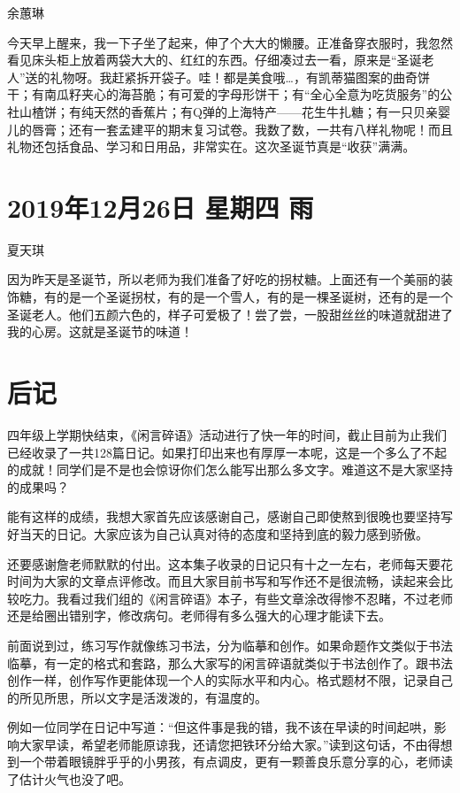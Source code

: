 余蕙琳

今天早上醒来，我一下子坐了起来，伸了个大大的懒腰。正准备穿衣服时，我忽然看见床头柜上放着两袋大大的、红红的东西。仔细凑过去一看，原来是“圣诞老人”送的礼物呀。我赶紧拆开袋子。哇！都是美食哦\ldots，有凯蒂猫图案的曲奇饼干；有南瓜籽夹心的海苔脆；有可爱的字母形饼干；有“全心全意为吃货服务”的公社山楂饼；有纯天然的香蕉片；有Q弹的上海特产——花生牛扎糖；有一只贝亲婴儿的唇膏；还有一套孟建平的期末复习试卷。我数了数，一共有八样礼物呢！而且礼物还包括食品、学习和日用品，非常实在。这次圣诞节真是“收获”满满。

\section{2019年12月26日 星期四 雨}

夏天琪

因为昨天是圣诞节，所以老师为我们准备了好吃的拐杖糖。上面还有一个美丽的装饰糖，有的是一个圣诞拐杖，有的是一个雪人，有的是一棵圣诞树，还有的是一个圣诞老人。他们五颜六色的，样子可爱极了！尝了尝，一股甜丝丝的味道就甜进了我的心房。这就是圣诞节的味道！

\section{后记}

四年级上学期快结束，《闲言碎语》活动进行了快一年的时间，截止目前为止我们已经收录了一共128篇日记。如果打印出来也有厚厚一本呢，这是一个多么了不起的成就！同学们是不是也会惊讶你们怎么能写出那么多文字。难道这不是大家坚持的成果吗？

能有这样的成绩，我想大家首先应该感谢自己，感谢自己即使熬到很晚也要坚持写好当天的日记。大家应该为自己认真对待的态度和坚持到底的毅力感到骄傲。

还要感谢詹老师默默的付出。这本集子收录的日记只有十之一左右，老师每天要花时间为大家的文章点评修改。而且大家目前书写和写作还不是很流畅，读起来会比较吃力。我看过我们组的《闲言碎语》本子，有些文章涂改得惨不忍睹，不过老师还是给圈出错别字，修改病句。老师得有多么强大的心理才能读下去。

前面说到过，练习写作就像练习书法，分为临摹和创作。如果命题作文类似于书法临摹，有一定的格式和套路，那么大家写的闲言碎语就类似于书法创作了。跟书法创作一样，创作写作更能体现一个人的实际水平和内心。格式题材不限，记录自己的所见所思，所以文字是活泼泼的，有温度的。

例如一位同学在日记中写道：“但这件事是我的错，我不该在早读的时间起哄，影响大家早读，希望老师能原谅我，还请您把铁环分给大家。”读到这句话，不由得想到一个带着眼镜胖乎乎的小男孩，有点调皮，更有一颗善良乐意分享的心，老师读了估计火气也没了吧。

